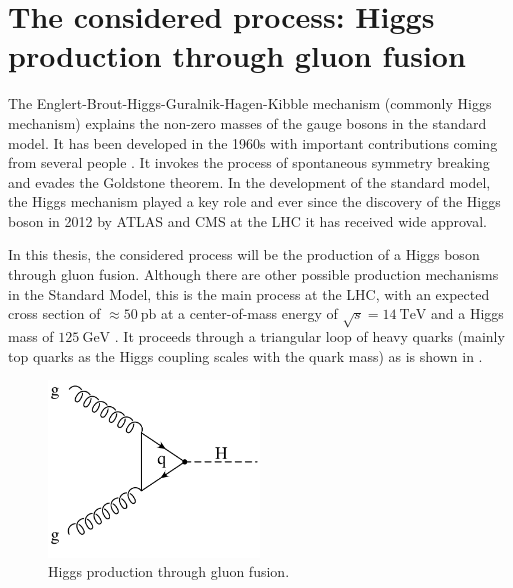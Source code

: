 \section{The considered process: Higgs production through gluon fusion}
The Englert-Brout-Higgs-Guralnik-Hagen-Kibble mechanism (commonly Higgs mechanism) explains the non-zero masses of the gauge bosons in the standard model.
It has been developed in the 1960s with important contributions coming from several people \cite{higgs1964a,higgs1964b,englert1964,guralnik1964,nambu1960,anderson1963}.
It invokes the process of spontaneous symmetry breaking and evades the Goldstone theorem.
In the development of the standard model, the Higgs mechanism played a key role and ever since the discovery of the Higgs boson in 2012 by ATLAS \cite{higgsdiscovery_atlas2012} and CMS \cite{higgsdiscovery_cms2012} at the LHC it has received wide approval.

In this thesis, the considered process will be the production of a Higgs boson through gluon fusion.
Although there are other possible production mechanisms in the Standard Model, this is the main process at the LHC, with an expected cross section of $\approx \SI{50}{\pico\barn}$ at a center-of-mass energy of $\sqrt{s} = \SI{14}{\tera\electronvolt}$ and a Higgs mass of $\SI{125}{\giga\electronvolt}$ \cite{higgshandbook1}.
It proceeds through a triangular loop of heavy quarks (mainly top quarks as the Higgs coupling scales with the quark mass) as is shown in .
%
\begin{figure}[]
	\includegraphics[width=0.5\textwidth]{images/gluonfusion.pdf}
	\caption{Higgs production through gluon fusion.}
	\label{fig:gluonfusion}
\end{figure}
%

